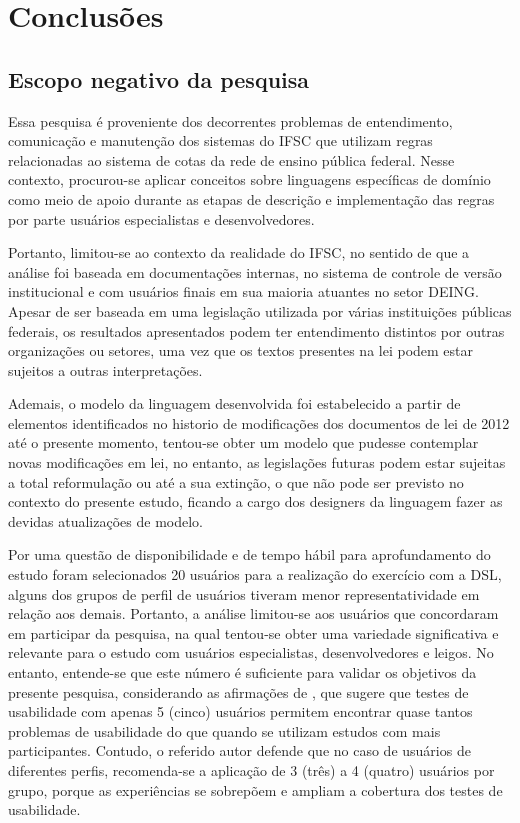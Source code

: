 \chapter{Conclusões}
\label{chap:consideracoes}



\section{Escopo negativo da pesquisa}
\label{escoponegativo}

Essa pesquisa é proveniente dos decorrentes problemas de entendimento, comunicação e manutenção dos sistemas do \gls{IFSC} que utilizam regras relacionadas ao sistema de cotas da rede de ensino pública federal. Nesse contexto, procurou-se aplicar conceitos sobre linguagens específicas de domínio como meio de apoio durante as etapas de descrição e implementação das regras por parte usuários especialistas e desenvolvedores. 

Portanto, limitou-se ao contexto da realidade do \gls{IFSC}, no sentido de que a análise foi baseada em documentações internas, no sistema de controle de versão institucional e com usuários finais em sua maioria atuantes no setor \gls{DEING}. Apesar de ser baseada em uma legislação utilizada por várias instituições públicas federais, os resultados apresentados podem ter entendimento distintos por outras organizações ou setores, uma vez que os textos presentes na lei podem estar sujeitos a outras interpretações. 

Ademais, o modelo da linguagem desenvolvida foi estabelecido a partir de elementos identificados no historio de modificações dos documentos de lei de 2012 até o presente momento, tentou-se obter um modelo que pudesse contemplar novas modificações em lei, no entanto, as legislações futuras podem estar sujeitas a total reformulação ou até a sua extinção, o que não pode ser previsto no contexto do presente estudo, ficando a cargo dos designers da linguagem fazer as devidas atualizações de modelo.

Por uma questão de disponibilidade e de tempo hábil para aprofundamento do estudo foram selecionados 20 usuários para a realização do exercício com a DSL, alguns dos grupos de perfil de usuários tiveram menor representatividade em relação aos demais. Portanto, a análise limitou-se aos usuários que concordaram em participar da pesquisa, na qual tentou-se obter uma variedade significativa e relevante para o estudo com usuários especialistas, desenvolvedores e leigos. No entanto, entende-se que este número é suficiente para validar os objetivos da presente pesquisa, considerando as afirmações de , que sugere que testes de usabilidade com apenas 5 (cinco) usuários permitem encontrar quase tantos problemas de usabilidade do que quando se utilizam estudos com mais participantes. Contudo, o referido autor defende que no caso de usuários de diferentes perfis, recomenda-se a aplicação de 3 (três) a 4 (quatro) usuários por grupo, porque as experiências se sobrepõem e ampliam a cobertura dos testes de usabilidade. 

